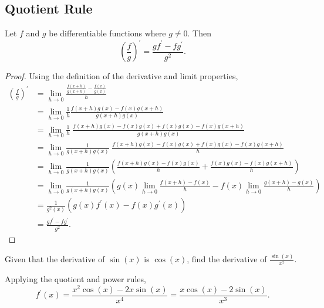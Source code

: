 \subsection{Quotient Rule}
\begin{lemma}
	Let $f$ and $g$ be differentiable functions where $g \neq 0$. Then
	\begin{equation}
		\left(\frac{f}{g}\right)^\prime = \frac{gf^\prime - fg^\prime}{g^2}.
	\end{equation}
\end{lemma}
\begin{proof}
	Using the definition of the derivative and limit properties,
	\begin{align*}
		\left(\frac{f}{g}\right)^\prime &= \lim_{h\to 0}{\frac{\frac{f(x+h)}{g(x+h)} - \frac{f(x)}{g(x)}}{h}} \\
		&= \lim_{h\to 0}{\frac{1}{h}\frac{f(x+h)g(x) - f(x)g(x+h)}{g(x+h)g(x)}} \\
		&= \lim_{h\to 0}{\frac{1}{h}\hspace{3pt}\frac{f(x+h)g(x) - f(x)g(x) + f(x)g(x) - f(x)g(x+h)}{g(x+h)g(x)}} \\
		&= \lim_{h \to 0}{\frac{1}{g(x+h)g(x)}\hspace{3pt}\frac{f(x+h)g(x)-f(x)g(x)+f(x)g(x)-f(x)g(x+h)}{h}} \\
		&= \lim_{h \to 0}{\frac{1}{g(x+h)g(x)}\left(\frac{f(x+h)g(x)-f(x)g(x)}{h}+\frac{f(x)g(x)-f(x)g(x+h)}{h}\right)} \\
		&= \lim_{h \to 0}{\frac{1}{g(x+h)g(x)}} \left(g(x)\lim_{h \to 0}{\frac{f(x+h)-f(x)}{h}} - f(x)\lim_{h\to 0}{\frac{g(x+h)-g(x)}{h}}\right) \\
		&= \frac{1}{g^2(x)}\left(g(x)f^\prime(x) - f(x)g^\prime(x)\right) \\
		&= \frac{gf^\prime - fg^\prime}{g^2}.
	\end{align*}
\end{proof}

\begin{example}
	Given that the derivative of $\sin{(x)}$ is $\cos{(x)}$, find the derivative of $\frac{\sin{(x)}}{x^2}$.
\end{example}
Applying the quotient and power rules,
\begin{equation*}
	f^\prime(x) = \frac{x^2\cos{(x) - 2x\sin{(x)}}}{x^4} = \frac{x\cos{(x)}-2\sin{(x)}}{x^3}.
\end{equation*}